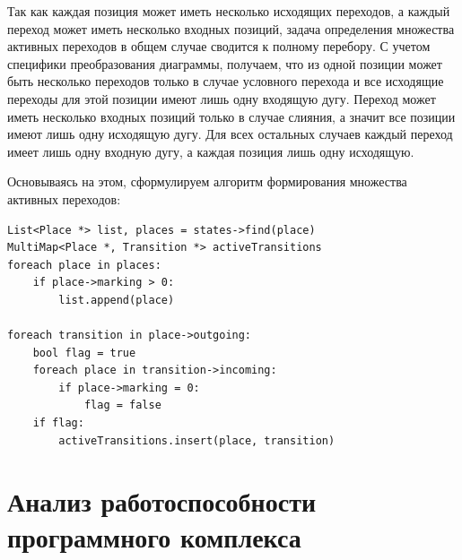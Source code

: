 Так как каждая позиция может иметь несколько исходящих переходов, а каждый переход может иметь несколько входных позиций, задача определения множества активных переходов в общем случае сводится к полному перебору. С учетом специфики преобразования диаграммы, получаем, что из одной позиции может быть несколько переходов только в случае условного перехода и все исходящие переходы для этой позиции имеют лишь одну входящую дугу. Переход может иметь несколько входных позиций только в случае слияния, а значит все позиции имеют лишь одну исходящую дугу. Для всех остальных случаев каждый переход имеет лишь одну входную дугу, а каждая позиция лишь одну исходящую.

Основываясь на этом, сформулируем алгоритм формирования множества активных переходов:
\begin{lstlisting}[style=pseudocode,caption={Алгоритм формирования множества активных переходов}]
List<Place *> list, places = states->find(place)
MultiMap<Place *, Transition *> activeTransitions
foreach place in places:
	if place->marking > 0:
		list.append(place)
		
foreach transition in place->outgoing:
	bool flag = true
	foreach place in transition->incoming:
		if place->marking = 0:
			flag = false
	if flag:
		activeTransitions.insert(place, transition)
\end{lstlisting}

\section{Анализ работоспособности программного комплекса}

\label{cha:implementation}
